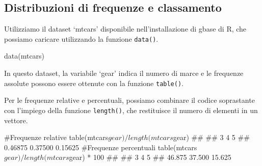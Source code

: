 \documentclass[a4paper,12pt,oneside]{book}
\newenvironment{Shaded}{\begin{snugshade}}{\end{snugshade}}
\newcommand{\DecValTok}[1]{#1}
\newcommand{\SpecialCharTok}[1]{#1}
\newcommand{\CommentTok}[1]{#1}
\newcommand{\DocumentationTok}[1]{#1}
\newcommand{\FunctionTok}[1]{#1}
\newcommand{\NormalTok}[1]{#1}
\begin{document}
\hypertarget{distribuzioni-di-frequenze-e-classamento-1}{%
\subsection{Distribuzioni di frequenze e classamento}\label{distribuzioni-di-frequenze-e-classamento-1}}

Utilizziamo il dataset `mtcars' disponibile nell'installazione di gbase di R, che possiamo caricare utilizzando la funzione \texttt{data()}.

\begin{Shaded}
\begin{Highlighting}[]
\FunctionTok{data}\NormalTok{(mtcars)}
\end{Highlighting}
\end{Shaded}

In questo dataset, la variabile `gear' indica il numero di marce e le frequenze assolute possono essere ottenute con la funzione \texttt{table()}.

\begin{Shaded}
\end{Shaded}

Per le frequenze relative e percentuali, possiamo combinare il codice soprastante con l'impiego della funzione \texttt{length()}, che restituisce il numero di elementi in un vettore.

\begin{Shaded}
\begin{Highlighting}[]
\CommentTok{\#Frequenze relative}
\FunctionTok{table}\NormalTok{(mtcars}\SpecialCharTok{$}\NormalTok{gear)}\SpecialCharTok{/}\FunctionTok{length}\NormalTok{(mtcars}\SpecialCharTok{$}\NormalTok{gear)}
\DocumentationTok{\#\# }
\DocumentationTok{\#\#       3       4       5 }
\DocumentationTok{\#\# 0.46875 0.37500 0.15625}
\CommentTok{\#Frequenze percentuali}
\FunctionTok{table}\NormalTok{(mtcars}\SpecialCharTok{$}\NormalTok{gear)}\SpecialCharTok{/}\FunctionTok{length}\NormalTok{(mtcars}\SpecialCharTok{$}\NormalTok{gear) }\SpecialCharTok{*} \DecValTok{100}
\DocumentationTok{\#\# }
\DocumentationTok{\#\#      3      4      5 }
\DocumentationTok{\#\# 46.875 37.500 15.625}
\end{Highlighting}
\end{Shaded}
\end{document}
